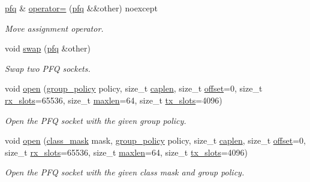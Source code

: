 \begin{DoxyCompactItemize}
\hyperlink{classnet_1_1pfq}{pfq} \& \hyperlink{classnet_1_1pfq_aeacd42c1616840fa20e67bbf47c71e70}{operator=} (\hyperlink{classnet_1_1pfq}{pfq} \&\&other) noexcept
\begin{DoxyCompactList}\small\item\em Move assignment operator. \end{DoxyCompactList}\item 
void \hyperlink{classnet_1_1pfq_a762b45c2020a73e503cdbc2b4631db1c}{swap} (\hyperlink{classnet_1_1pfq}{pfq} \&other)
\begin{DoxyCompactList}\small\item\em Swap two P\-F\-Q sockets. \end{DoxyCompactList}\item 
void \hyperlink{classnet_1_1pfq_a100388ca866fb38102a8d96581f1f16d}{open} (\hyperlink{namespacenet_aedc1a0dde937ddbd0800af02920b1067}{group\-\_\-policy} policy, size\-\_\-t \hyperlink{classnet_1_1pfq_aa915603b2ad8d1226f9bbea0050945c0}{caplen}, size\-\_\-t \hyperlink{classnet_1_1pfq_a83ed78c8c7bc2de33e75e244bbc0b603}{offset}=0, size\-\_\-t \hyperlink{classnet_1_1pfq_a878c768492c68fc572a994a58913a3db}{rx\-\_\-slots}=65536, size\-\_\-t \hyperlink{classnet_1_1pfq_a0424e39990711493af4f24a0c3e9be4d}{maxlen}=64, size\-\_\-t \hyperlink{classnet_1_1pfq_aae98015b961c6210081fa29a2ea34da2}{tx\-\_\-slots}=4096)
\begin{DoxyCompactList}\small\item\em Open the P\-F\-Q socket with the given group policy. \end{DoxyCompactList}\item 
void \hyperlink{classnet_1_1pfq_a99183f977ae2dcfa2788b9f1a7f29097}{open} (\hyperlink{namespacenet_a1dbd93552dc6ef6fbb0bb79d43ca22fd}{class\-\_\-mask} mask, \hyperlink{namespacenet_aedc1a0dde937ddbd0800af02920b1067}{group\-\_\-policy} policy, size\-\_\-t \hyperlink{classnet_1_1pfq_aa915603b2ad8d1226f9bbea0050945c0}{caplen}, size\-\_\-t \hyperlink{classnet_1_1pfq_a83ed78c8c7bc2de33e75e244bbc0b603}{offset}=0, size\-\_\-t \hyperlink{classnet_1_1pfq_a878c768492c68fc572a994a58913a3db}{rx\-\_\-slots}=65536, size\-\_\-t \hyperlink{classnet_1_1pfq_a0424e39990711493af4f24a0c3e9be4d}{maxlen}=64, size\-\_\-t \hyperlink{classnet_1_1pfq_aae98015b961c6210081fa29a2ea34da2}{tx\-\_\-slots}=4096)
\begin{DoxyCompactList}\small\item\em Open the P\-F\-Q socket with the given class mask and group policy. \end{DoxyCompactList}\item 

\end{DoxyCompactItemize}
